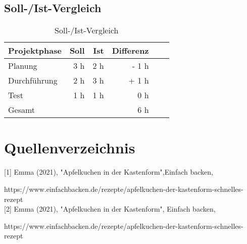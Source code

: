 \subsection{Soll-/Ist-Vergleich}
\begin{table}[h]
    \centering
    \begin{tabular}{l*{4}{r}r|}
        \hline
        Projektphase    & Soll & Ist & Differenz\\
        \hline
        Planung & 3 h & 2 h & - 1 h\\
        Durchführung    & 2 h & 3 h & + 1 h \\
        Test      & 1 h & 1 h & 0 h   \\
        \hline
        Gesamt & & & 6 h \\
        \hline
        \end{tabular}
        \caption{Soll-/Ist-Vergleich}
\end{table}
\newpage
\section{Quellenverzeichnis}
[1] Emma (2021), "Apfelkuchen in der Kastenform",Einfach backen,

https://www.einfachbacken.de/rezepte/apfelkuchen-der-kastenform-schnelles-rezept
\\[5pt]
[2] Emma (2021), "Apfelkuchen in der Kastenform", Einfach backen,

https://www.einfachbacken.de/rezepte/apfelkuchen-der-kastenform-schnelles-rezept
